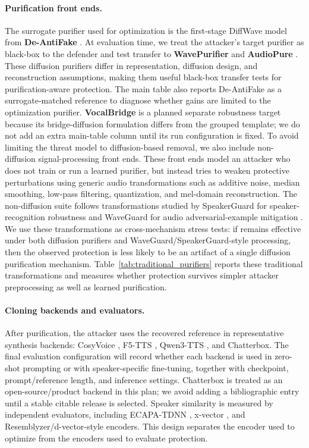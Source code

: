 \paragraph{Purification front ends.}
The surrogate purifier used for optimization is the first-stage DiffWave model from \textbf{De-AntiFake} \cite{fan2025deantifake}. 
At evaluation time, we treat the attacker's target purifier as black-box to the defender and test transfer to \textbf{WavePurifier} \cite{guo2024wavepurifier} 
and \textbf{AudioPure} \cite{wu2023audiopure}. 
These diffusion purifiers differ in representation, diffusion design, and reconstruction assumptions, making them useful black-box transfer tests for purification-aware protection.
The main table also reports De-AntiFake as a surrogate-matched reference to diagnose whether gains are limited to the optimization purifier.
\textbf{VocalBridge} \cite{abbasihafshejani2026vocalbridge} is a planned separate robustness target because its bridge-diffusion formulation differs from the grouped template; 
we do not add an extra main-table column until its run configuration is fixed.
To avoid limiting the threat model to diffusion-based removal, we also include non-diffusion signal-processing front ends. 
These front ends model an attacker who does not train or run a learned purifier, but instead tries to weaken protective perturbations using generic audio transformations such as additive noise, median smoothing, low-pass filtering, quantization, and mel-domain reconstruction. 
The non-diffusion suite follows transformations studied by SpeakerGuard for speaker-recognition robustness and WaveGuard for audio adversarial-example mitigation \cite{chen2023speakerguard,hussain2021waveguard}. 
We use these transformations as cross-mechanism stress tests: if \method{} remains effective under both diffusion purifiers and WaveGuard/SpeakerGuard-style processing, then the observed protection is less likely to be an artifact of a single diffusion purification mechanism. 
Table~\ref{tab:traditional_purifiers} reports these traditional transformations and measures whether protection survives simpler attacker preprocessing as well as learned purification.

\paragraph{Cloning backends and evaluators.}
After purification, the attacker uses the recovered reference in representative synthesis backends: CosyVoice \cite{du2024cosyvoice}, F5-TTS \cite{chen2025f5tts}, Qwen3-TTS \cite{hu2026qwen3tts}, and Chatterbox. 
The final evaluation configuration will record whether each backend is used in zero-shot prompting or with speaker-specific fine-tuning, together with checkpoint, prompt/reference length, and inference settings. 
Chatterbox is treated as an open-source/product backend in this plan; we avoid adding a bibliographic entry until a stable citable release is selected.
Speaker similarity is measured by independent evaluators, including ECAPA-TDNN \cite{desplanques2020ecapa}, x-vector \cite{snyder2018xvectors}, and Resemblyzer/d-vector-style encoders. 
This design separates the encoder used to optimize \method{} from the encoders used to evaluate protection.

